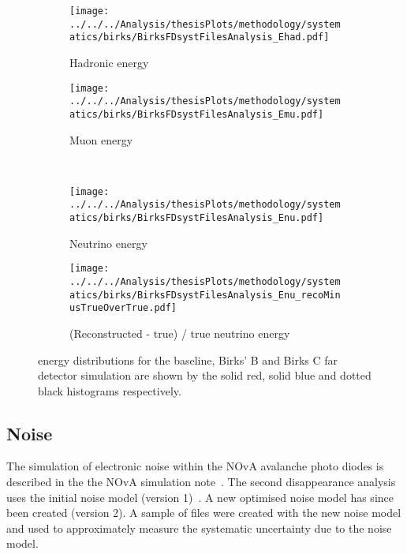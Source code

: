 \begin{figure}%
  \begin{subfigure}{.5\textwidth}
    \centering
    \texttt{[image: ../../../Analysis/thesisPlots/methodology/systematics/birks/BirksFDsystFilesAnalysis\_Ehad.pdf]}
    \caption{Hadronic energy}
    \label{fig:systsFDBirks_had}
  \end{subfigure}%
  \begin{subfigure}{.5\textwidth}
    \centering
    \texttt{[image: ../../../Analysis/thesisPlots/methodology/systematics/birks/BirksFDsystFilesAnalysis\_Emu.pdf]}
    \caption{Muon energy }
    \label{fig:systsFDBirks_mu}
  \end{subfigure}\\
  \begin{subfigure}{.5\textwidth}
    \centering
    \texttt{[image: ../../../Analysis/thesisPlots/methodology/systematics/birks/BirksFDsystFilesAnalysis\_Enu.pdf]}
    \caption{Neutrino energy}
    \label{fig:systsFDBirks_nu}
  \end{subfigure}%
  \begin{subfigure}{.5\textwidth}
    \centering
    \texttt{[image: ../../../Analysis/thesisPlots/methodology/systematics/birks/BirksFDsystFilesAnalysis\_Enu\_recoMinusTrueOverTrue.pdf]}
    \caption{(Reconstructed  - true) / true neutrino energy }
    \label{fig:systsFDBirks_rmtot}
  \end{subfigure}
  \caption{energy distributions for the baseline, Birks' B and Birks C
    far detector simulation are shown by the solid red, solid blue
    and dotted black histograms respectively. }
  \label{fig:systsFDBirks}
\end{figure}

\subsection{Noise}\label{sec:noisesysts}

The simulation of electronic noise within the NOvA avalanche photo
diodes is described in the the NOvA simulation
note~\cite{adamNOvASim}. 
The second disappearance analysis uses the initial noise model
(version 1)~\cite{SASummary}. 
A new optimised noise model has since been created (version 2). 
A sample of files were created with the new noise model and used to
approximately measure the systematic uncertainty due to the noise
model. 

